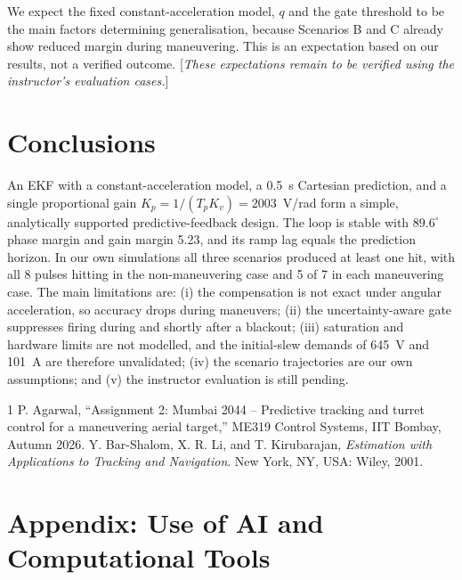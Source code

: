 \documentclass[conference]{IEEEtran}
\newcommand{\Tp}{T_p}
\newcommand{\Kp}{K_p}
\newcommand{\Kv}{K_v}
\begin{document}
We expect the fixed constant-acceleration model, $q$ and the gate threshold to be the main factors determining generalisation, because Scenarios B and C already show reduced margin during maneuvering. This is an expectation based on our results, not a verified outcome. [\emph{These expectations remain to be verified using the instructor's
evaluation cases.}]

\section{Conclusions}

An EKF with a constant-acceleration model, a 0.5~s Cartesian prediction, and a single proportional gain $\Kp=1/(\Tp\Kv)=2003$~V/rad form a simple, analytically supported predictive-feedback design. The loop is stable with $89.6^\circ$ phase margin and gain margin 5.23, and its ramp lag equals the prediction horizon. In our own simulations all three scenarios produced at least one hit, with all 8 pulses hitting in the non-maneuvering case and 5 of 7 in each maneuvering case. The main limitations are: (i) the compensation is not exact under angular acceleration, so accuracy drops during maneuvers; (ii) the uncertainty-aware gate suppresses firing during and shortly after a blackout; (iii) saturation and hardware limits are not modelled, and the initial-slew demands of 645~V and 101~A are therefore unvalidated; (iv) the scenario trajectories are our own assumptions; and (v) the instructor evaluation is still pending.

\begin{thebibliography}{1}
 P. Agarwal, ``Assignment 2: Mumbai 2044 -- Predictive tracking and turret control for a maneuvering aerial target,'' ME319 Control Systems, IIT Bombay, Autumn 2026.
 Y. Bar-Shalom, X. R. Li, and T. Kirubarajan, \emph{Estimation with Applications to Tracking and Navigation}. New York, NY, USA: Wiley, 2001.
\end{thebibliography}

\clearpage
\onecolumn
\section*{Appendix: Use of AI and Computational Tools}
\end{document}
